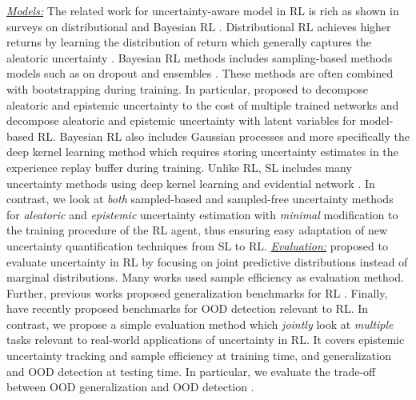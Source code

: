 \underline{\textit{Models:}} The related work for uncertainty-aware model in RL is rich as shown in surveys on distributional and Bayesian  RL \cite{bayesian-rl, distributional-rl}. Distributional RL \cite{distributional-rl, nonparametric-return-distribution, distributional-rl-prespective, iqn} achieves higher returns by learning the distribution of return which generally captures the aleatoric uncertainty \cite{information-directed-exploration-deep-rl}. Bayesian RL methods includes sampling-based methods models such as on dropout \cite{dropout, uncertainty-rl-collision-avoidance} and ensembles \cite{bootstrapped-dqn, randomized-prior-functions, safe-rl-model-uncertainty, rl-active-learning, epistemic-pomdp}. These methods are often combined with bootstrapping during training. In particular, \cite{risk-uncertainty-deep-rl} proposed to decompose aleatoric and epistemic uncertainty to the cost of multiple trained networks and \cite{decomposition-uncertatinty-bayesian-dl} decompose aleatoric and epistemic uncertainty with latent variables for model-based RL. Bayesian RL also includes Gaussian processes \citep{gp-rl, rl-gp} and more specifically the deep kernel learning method \citep{deep-rl-deep-kernel-leanring} which requires storing uncertainty estimates in the experience replay buffer during training. Unlike RL, SL includes many uncertainty methods using deep kernel learning \citep{due, duq, simple-baseline-uncertainty} and evidential network \cite{postnet, natpn, graph-postnet, priornet, regression-priornet, evidential-regression, robustness-uncertainty-dirichlet}. In contrast, we look at \emph{both} sampled-based and sampled-free uncertainty methods for \emph{aleatoric} and \emph{epistemic} uncertainty estimation with \emph{minimal} modification to the training procedure of the RL agent, thus ensuring easy adaptation of new uncertainty quantification techniques from SL to RL. 
\underline{\textit{Evaluation:}} \cite{bsuite-rl, testbed-rl} proposed to evaluate uncertainty in RL by focusing on joint predictive distributions instead of marginal distributions. Many works \cite{sample-efficient-ac, sample-efficient-rl-stochastic-ensemble, q-prop-sample-efficient, rl-fast-slow} used sample efficiency as evaluation method. Further, previous works proposed generalization benchmarks for RL \cite{generalization-rl-survey, assessing-generalization-rl, qyantifying-generalization-rl, procgen}. Finally, \cite{ood-dynamic-benchmark, benchmark-ood-detection-rl} have recently proposed benchmarks for OOD detection relevant to RL. In contrast, we propose a simple evaluation method which \emph{jointly} look at \emph{multiple} tasks relevant to real-world applications of uncertainty in RL. It covers epistemic uncertainty tracking and sample efficiency at training time, and generalization and OOD detection at testing time. In particular, we evaluate the trade-off between OOD generalization \cite{ood-generalization-survey} and OOD detection \cite{ood-detection-survey}.